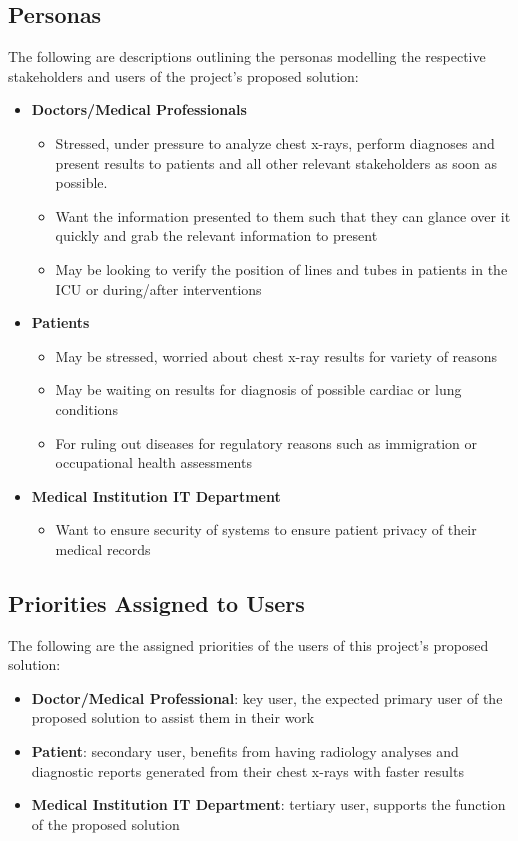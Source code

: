 \documentclass[12pt]{article}
\begin{document}
\subsection{Personas}
The following are descriptions outlining the personas modelling the respective stakeholders and users of the project’s proposed solution:
\begin{itemize}
    \item \textbf{Doctors/Medical Professionals}
    \begin{itemize}
        \item Stressed, under pressure to analyze chest x-rays, perform diagnoses and present results to patients and all other relevant stakeholders as soon as possible. 
        \item Want the information presented to them such that they can glance over it quickly and grab the relevant information to present 
        \item May be looking to verify the position of lines and tubes in patients in the ICU or during/after interventions 
    \end{itemize}
    \item \textbf{Patients}
    \begin{itemize}
        \item May be stressed, worried about chest x-ray results for variety of reasons 
        \item May be waiting on results for diagnosis of possible cardiac or lung conditions 
        \item For ruling out diseases for regulatory reasons such as immigration or occupational health assessments 
    \end{itemize}
    \item \textbf{Medical Institution IT Department}
    \begin{itemize}
        \item Want to ensure security of systems to ensure patient privacy of their medical records 
    \end{itemize}
\end{itemize}

\subsection{Priorities Assigned to Users}
The following are the assigned priorities of the users of this project's proposed solution:
\begin{itemize}
    \item \textbf{Doctor/Medical Professional}: key user, the expected primary user of the proposed solution to assist them in their work
    \item \textbf{Patient}: secondary user, benefits from having radiology analyses and diagnostic reports generated from their chest x-rays with faster results
    \item \textbf{Medical Institution IT Department}: tertiary user, supports the function of the proposed solution
\end{itemize}
\end{document}
